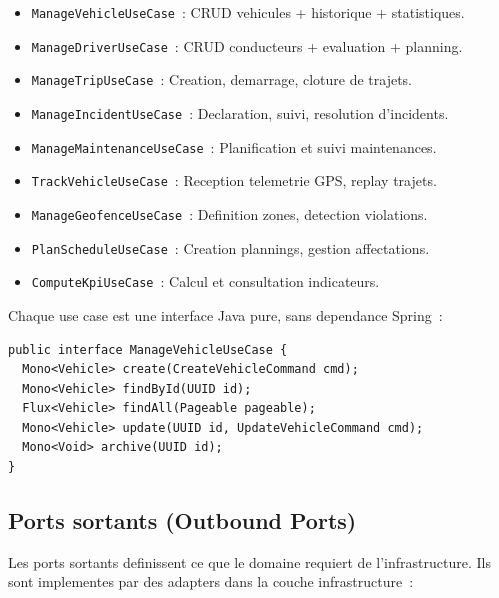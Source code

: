 \documentclass[12pt,a4paper]{report}
\begin{document}
\begin{itemize}[leftmargin=2cm]
  \item \texttt{ManageVehicleUseCase}~: CRUD vehicules + historique + statistiques.
  \item \texttt{ManageDriverUseCase}~: CRUD conducteurs + evaluation + planning.
  \item \texttt{ManageTripUseCase}~: Creation, demarrage, cloture de trajets.
  \item \texttt{ManageIncidentUseCase}~: Declaration, suivi, resolution d'incidents.
  \item \texttt{ManageMaintenanceUseCase}~: Planification et suivi maintenances.
  \item \texttt{TrackVehicleUseCase}~: Reception telemetrie GPS, replay trajets.
  \item \texttt{ManageGeofenceUseCase}~: Definition zones, detection violations.
  \item \texttt{PlanScheduleUseCase}~: Creation plannings, gestion affectations.
  \item \texttt{ComputeKpiUseCase}~: Calcul et consultation indicateurs.
\end{itemize}

Chaque use case est une interface Java pure, sans dependance Spring~:

\begin{verbatim}
public interface ManageVehicleUseCase {
  Mono<Vehicle> create(CreateVehicleCommand cmd);
  Mono<Vehicle> findById(UUID id);
  Flux<Vehicle> findAll(Pageable pageable);
  Mono<Vehicle> update(UUID id, UpdateVehicleCommand cmd);
  Mono<Void> archive(UUID id);
}
\end{verbatim}

\subsection{Ports sortants (Outbound Ports)}

Les ports sortants definissent ce que le domaine requiert de l'infrastructure.
Ils sont implementes par des adapters dans la couche infrastructure~:
\end{document}
